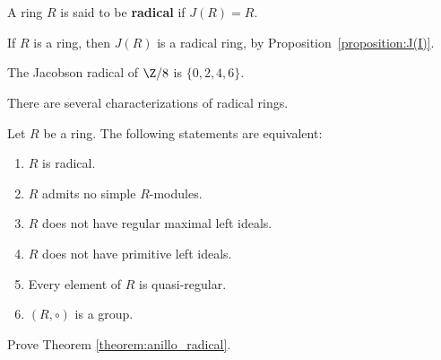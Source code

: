 \chapter{}

\begin{definition}
A ring $R$ is said to be \textbf{radical} if $J(R)=R$. 
\end{definition}

\begin{example}
	If $R$ is a ring, then $J(R)$ is a radical ring, by Proposition~\ref{proposition:J(I)}.
\end{example}

\begin{example}
	The Jacobson radical of $\Z/8$ is $\{0,2,4,6\}$. 
\end{example}

There are several characterizations of radical rings. 

\begin{theorem}
	\label{theorem:anillo_radical}
	Let $R$ be a ring. The following statements are equivalent: 
	\begin{enumerate}
		\item $R$ is radical.
		\item $R$ admits no simple $R$-modules. 
		\item $R$ does not have regular maximal left ideals.
		\item $R$ does not have primitive left ideals.
		\item Every element of $R$ is quasi-regular. 
		\item $(R,\circ)$ is a group. 
	\end{enumerate}
\end{theorem}

\begin{exercise}
    Prove Theorem \ref{theorem:anillo_radical}. 
\end{exercise}
%    
%
%	
%	
%

